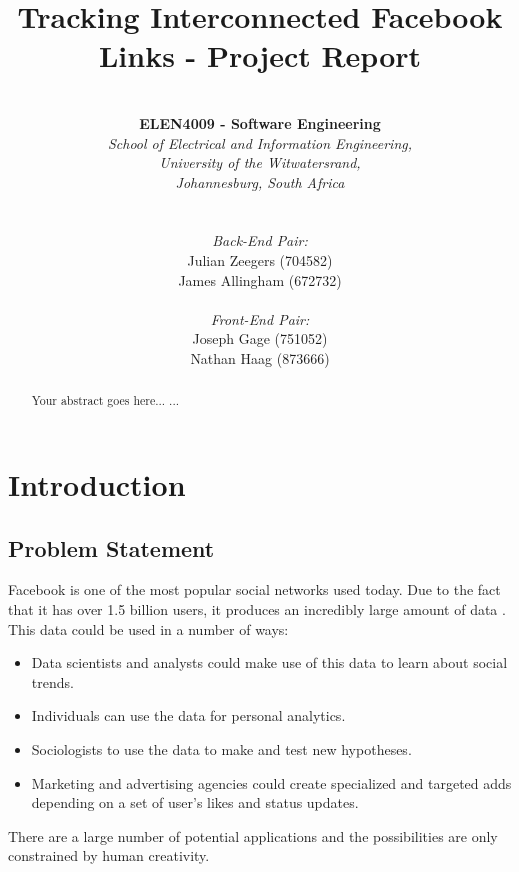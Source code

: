 \documentclass[12pt,onecolumn]{article}
\title{\huge Tracking Interconnected Facebook Links - Project Report}
\author{ \horrule{1pt} \\ \textbf{ELEN4009 - Software Engineering} \\ \emph{School of Electrical and Information Engineering,} \\ \emph{University of the Witwatersrand,} \\ \emph{Johannesburg, South Africa} \\ \horrule{1pt} \\\\ \emph{Back-End Pair:} \\ Julian Zeegers (704582) \\ James Allingham (672732) \\ \\ \emph{Front-End Pair:} \\ Joseph Gage (751052)\\ Nathan Haag (873666) \\ \horrule{1pt}}
\begin{document}
\date{\vspace{-5ex}}
\maketitle
\pagestyle{plain}
\thispagestyle{empty}

\begin{abstract}
Your abstract goes here...
...
\end{abstract}

\newpage

\tableofcontents
\listoffigures
\listoftables
\thispagestyle{empty}
\setcounter{page}{0}

\newpage

\section{Introduction}

	\subsection{Problem Statement} %

	Facebook is one of the most popular social networks used today. Due to the fact that it has over 1.5 billion users, it produces an incredibly large amount of data \cite{fb}. This data could be used in a number of ways:

	\begin{itemize}
		\item Data scientists and analysts could make use of this data to learn about social trends.

		\item Individuals can use the data for personal analytics.

		\item Sociologists to use the data to make and test new hypotheses.

		\item Marketing and advertising agencies could create specialized and targeted adds depending on a set of user's likes and status updates.

	\end{itemize}    

	There are a large number of potential applications and the possibilities are only constrained by human creativity.
\end{document}
